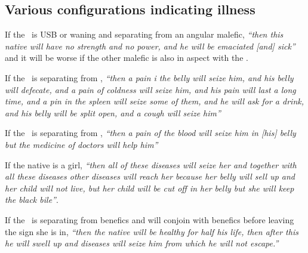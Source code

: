 \subsection{Various configurations indicating illness}

If  the \Moon\, is USB or waning and separating from an angular malefic, \textsl{``then this native will have no strength and no power, and he will be emaciated [and] sick''} and it will be worse if the other malefic is also in aspect with the \Moon.

If  the \Moon\, is separating from \Saturn, \textsl{``then a pain i the belly will seize him, and his belly will defecate, and a pain of coldness will seize him, and his pain will last a long time, and a pin in the spleen will seize some of them, and he will ask for a drink, and his belly will be split open, and a cough will seize him''} 

If  the \Moon\, is separating from \Mars, \textsl{``then a pain of the blood will seize him in [his] belly but the medicine of doctors will help him''}

If  the native is a girl, \textsl{``then all of these diseases will seize her and together with all these diseases other diseases will reach her because her belly will sell up and her child will not live, but her child will be cut off in her belly but she will keep the black bile''}.

If  the \Moon\, is separating from benefics and will conjoin with benefics before leaving the sign she is in, \textsl{``then the native will be healthy for half his life, then after this he will swell up and diseases will seize him from which he will not escape.''}
